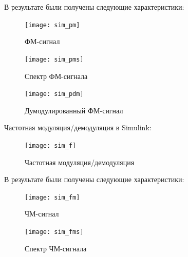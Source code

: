 \documentclass[10pt,a4paper]{article}
\begin{document}
В результате были получены следующие характеристики:
\begin{figure}[h]\centering
  \parbox[b]{0.49\textwidth}{\centering
    \texttt{[image: sim\_pm]} 
    \caption{ФМ-сигнал}\label{fig.sim_pm}}
  \hfil\hfil 
  \begin{minipage}[b]{0.49\textwidth}
	\centering
	\texttt{[image: sim\_pms]}
	\caption{Спектр ФМ-сигнала}\label{fig.sim_pms} 
  \end{minipage}
\end{figure}

\begin{figure}[h]\centering
    \texttt{[image: sim\_pdm]} 
    \caption{Думодулированный ФМ-сигнал}\label{fig.sim_pdm}
\end{figure}
\FloatBarrier

Частотная модуляция/демодуляция в Simulink:
\begin{figure}[h]\centering
    \texttt{[image: sim\_f]} 
    \caption{Частотная модуляция/демодуляция}\label{fig.sim_f}
\end{figure}                                                                                                                                                                                                                                                                                                                                                                                                                                                                                                                                                                                                                                                                                                                                                                                                                                                                                                                                                                                                                                                                                                                                                                                                                                                                                                                                                                                                                                                                       

В результате были получены следующие характеристики:
\begin{figure}[h]\centering
  \parbox[b]{0.49\textwidth}{\centering
    \texttt{[image: sim\_fm]} 
    \caption{ЧМ-сигнал}\label{fig.sim_fm}}
  \hfil\hfil 
  \begin{minipage}[b]{0.49\textwidth}
	\centering
	\texttt{[image: sim\_fms]}
	\caption{Спектр ЧМ-сигнала}\label{fig.sim_fms} 
  \end{minipage}
\end{figure}
\end{document}
